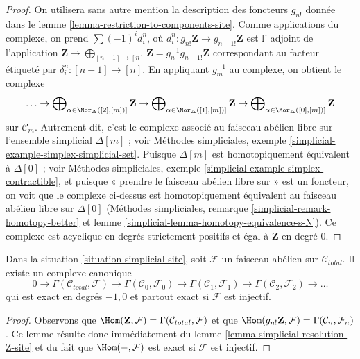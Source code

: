 \begin{proof}
On utilisera sans autre mention la description des foncteurs $g_{n!}$ donnée dans le
lemme \ref{lemma-restriction-to-components-site}. Comme applications du complexe,
on prend $\sum (-1)^i d^n_i$, où
$d^n_i : g_{n!}\mathbf{Z} \to g_{n - 1!}\mathbf{Z}$ est l'
adjoint de l'application $\mathbf{Z} \to
\bigoplus_{[n - 1] \to [n]} \mathbf{Z} = g_n^{-1}g_{n - 1!}\mathbf{Z}$
correspondant au facteur étiqueté par $\delta^n_i : [n - 1] \to [n]$.
En appliquant $g_m^{-1}$ au complexe, on obtient le complexe
$$
\ldots \to
\bigoplus\nolimits_{\alpha \in \Mor_\Delta([2], [m])]} \mathbf{Z} \to
\bigoplus\nolimits_{\alpha \in \Mor_\Delta([1], [m])]} \mathbf{Z} \to
\bigoplus\nolimits_{\alpha \in \Mor_\Delta([0], [m])]} \mathbf{Z}
$$
sur $\mathcal{C}_m$.
Autrement dit, c'est le complexe associé au
faisceau abélien libre sur l'ensemble simplicial $\Delta[m]$ ; voir
Méthodes simpliciales, exemple \ref{simplicial-example-simplex-simplicial-set}.
Puisque $\Delta[m]$ est homotopiquement équivalent à $\Delta[0]$ ; voir
Méthodes simpliciales, exemple \ref{simplicial-example-simplex-contractible},
et puisque « prendre le faisceau abélien libre sur » est un foncteur,
on voit que le complexe ci-dessus est homotopiquement équivalent au
faisceau abélien libre sur $\Delta[0]$
(Méthodes simpliciales, remarque \ref{simplicial-remark-homotopy-better} et
lemme \ref{simplicial-lemma-homotopy-equivalence-s-N}).
Ce complexe est acyclique en degrés strictement positifs
et égal à $\mathbf{Z}$ en degré $0$.
\end{proof}

\begin{lemma}
\label{lemma-cech-complex}
Dans la situation \ref{situation-simplicial-site}, soit $\mathcal{F}$ un faisceau
abélien sur $\mathcal{C}_{total}$. Il existe un complexe canonique
$$
0 \to \Gamma(\mathcal{C}_{total}, \mathcal{F}) \to
\Gamma(\mathcal{C}_0, \mathcal{F}_0) \to
\Gamma(\mathcal{C}_1, \mathcal{F}_1) \to
\Gamma(\mathcal{C}_2, \mathcal{F}_2) \to \ldots
$$
qui est exact en degrés $-1, 0$ et partout exact
si $\mathcal{F}$ est injectif.
\end{lemma}

\begin{proof}
Observons que
$\Hom(\mathbf{Z}, \mathcal{F}) = \Gamma(\mathcal{C}_{total}, \mathcal{F})$
et que
$\Hom(g_{n!}\mathbf{Z}, \mathcal{F}) = \Gamma(\mathcal{C}_n, \mathcal{F}_n)$.
Ce lemme résulte donc immédiatement du
lemme \ref{lemma-simplicial-resolution-Z-site}
et du fait que $\Hom(-, \mathcal{F})$ est exact si
$\mathcal{F}$ est injectif.
\end{proof}

